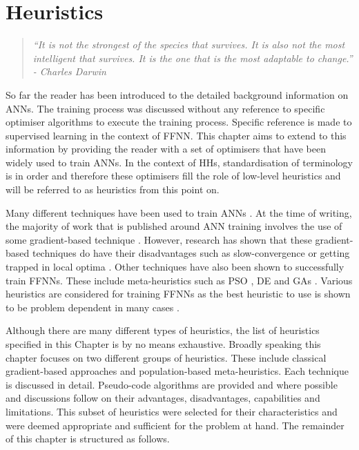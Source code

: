 \chapter{Heuristics}
\label{chap:heuristics}

\begin{quotation}
      \textit{``It is not the strongest of the species that survives. It is also not the most intelligent that survives. It is the one that is the most adaptable to change.'' - Charles Darwin}
\end{quotation}

So far the reader has been introduced to the detailed background information on \acp{ANN}. The training process was discussed without any reference to specific optimiser algorithms to execute the training process. Specific reference is made to supervised learning in the context of \ac{FFNN}. This chapter aims to extend to this information by providing the reader with a set of optimisers that have been widely used to train \acp{ANN}. In the context of \acp{HH}, standardisation of terminology is in order and therefore these optimisers fill the role of low-level heuristics and will be referred to as heuristics from this point on.

Many different techniques have been used to train \acp{ANN} \cite{ref:kingma:2014}.  At the time of writing, the majority of work that is published around \ac{ANN} training involves the use of some gradient-based technique \cite{ref:nel:2021}. However, research has shown that these gradient-based techniques do have their disadvantages such as slow-convergence or getting trapped in local optima \cite{ref:mingguang:2009}. Other techniques have also been shown to successfully train \acp{FFNN}. These include meta-heuristics such as  \ac{PSO} \cite{ref:rakitianskaia:2012}\cite{ref:vanwyk:2014}, \ac{DE} \cite{ref:espinal:2011} and \acp{GA} \cite{ref:gupta:1999}. Various heuristics are considered for training \acp{FFNN} as the best heuristic to use is shown to be problem dependent in many cases \cite{ref:kheiri:2017}.

Although there are many different types of heuristics, the list of heuristics specified in this Chapter is by no means exhaustive. Broadly speaking this chapter focuses on two different groups of heuristics. These include classical gradient-based approaches and population-based meta-heuristics. Each technique is discussed in detail. Pseudo-code algorithms are provided and where possible and discussions follow on their advantages, disadvantages, capabilities and limitations. This subset of heuristics were selected for their characteristics and were deemed appropriate and sufficient for the problem at hand. The remainder of this chapter is structured as follows.

